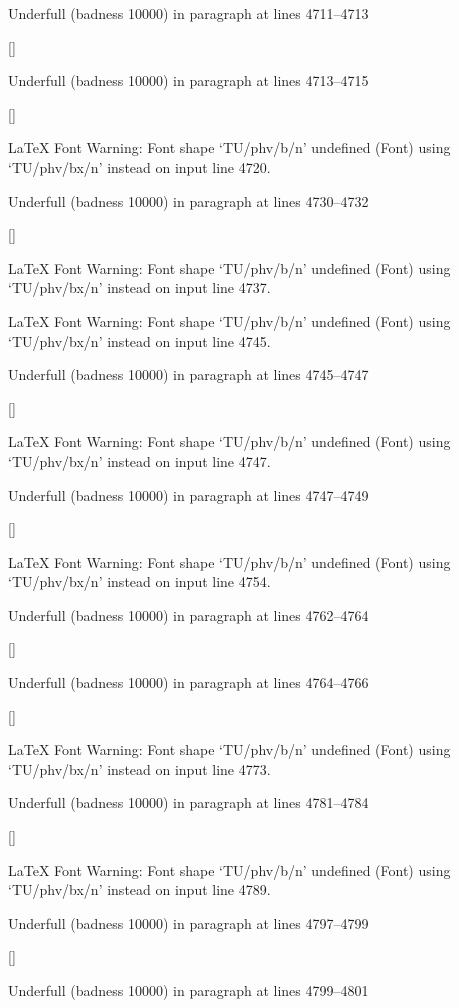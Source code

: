 Underfull \hbox (badness 10000) in paragraph at lines 4711--4713

 []


Underfull \hbox (badness 10000) in paragraph at lines 4713--4715

 []


LaTeX Font Warning: Font shape `TU/phv/b/n' undefined
(Font)              using `TU/phv/bx/n' instead on input line 4720.


Underfull \hbox (badness 10000) in paragraph at lines 4730--4732

 []


LaTeX Font Warning: Font shape `TU/phv/b/n' undefined
(Font)              using `TU/phv/bx/n' instead on input line 4737.


LaTeX Font Warning: Font shape `TU/phv/b/n' undefined
(Font)              using `TU/phv/bx/n' instead on input line 4745.


Underfull \hbox (badness 10000) in paragraph at lines 4745--4747

 []


LaTeX Font Warning: Font shape `TU/phv/b/n' undefined
(Font)              using `TU/phv/bx/n' instead on input line 4747.


Underfull \hbox (badness 10000) in paragraph at lines 4747--4749

 []


LaTeX Font Warning: Font shape `TU/phv/b/n' undefined
(Font)              using `TU/phv/bx/n' instead on input line 4754.


Underfull \hbox (badness 10000) in paragraph at lines 4762--4764

 []


Underfull \hbox (badness 10000) in paragraph at lines 4764--4766

 []


LaTeX Font Warning: Font shape `TU/phv/b/n' undefined
(Font)              using `TU/phv/bx/n' instead on input line 4773.


Underfull \hbox (badness 10000) in paragraph at lines 4781--4784

 []


LaTeX Font Warning: Font shape `TU/phv/b/n' undefined
(Font)              using `TU/phv/bx/n' instead on input line 4789.


Underfull \hbox (badness 10000) in paragraph at lines 4797--4799

 []


Underfull \hbox (badness 10000) in paragraph at lines 4799--4801

